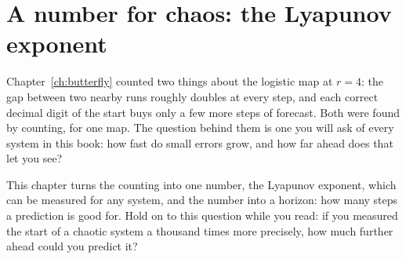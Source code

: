 
\chapter{A number for chaos: the Lyapunov exponent}
\label{ch:lyapunov}

\noindent
Chapter~\ref{ch:butterfly} counted two things about the logistic map at
$r = 4$: the gap between two nearby runs roughly doubles at every step, and
each correct decimal digit of the start buys only a few more steps of
forecast. Both were found by counting, for one map. The question behind them
is one you will ask of every system in this book: how fast do small errors
grow, and how far ahead does that let you see?

This chapter turns the counting into one number, the Lyapunov exponent, which
can be measured for any system, and the number into a horizon: how many steps
a prediction is good for. Hold on to this question while you read: if you
measured the start of a chaotic system a thousand times more precisely, how
much further ahead could you predict it?

\begin{outcomes}
\end{outcomes}

